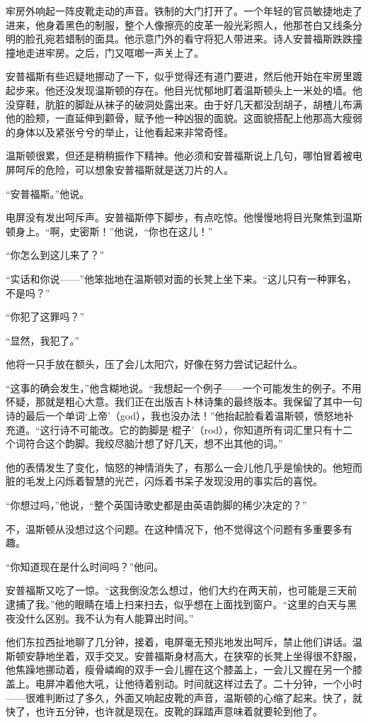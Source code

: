 牢房外响起一阵皮靴走动的声音。铁制的大门打开了。一个年轻的官员敏捷地走了进来，他身着黑色的制服，整个人像擦亮的皮革一般光彩照人，他那苍白又线条分明的脸孔宛若蜡制的面具。他示意门外的看守将犯人带进来。诗人安普福斯跌跌撞撞地走进牢房。之后，门又哐啷一声关上了。

安普福斯有些迟疑地挪动了一下，似乎觉得还有道门要进，然后他开始在牢房里踱起步来。他还没发现温斯顿的存在。他目光忧郁地盯着温斯顿头上一米处的墙。他没穿鞋，肮脏的脚趾从袜子的破洞处露出来。由于好几天都没刮胡子，胡楂儿布满他的脸颊，一直延伸到颧骨，赋予他一种凶狠的面貌。这面貌搭配上他那高大瘦弱的身体以及紧张兮兮的举止，让他看起来非常奇怪。

温斯顿很累，但还是稍稍振作下精神。他必须和安普福斯说上几句，哪怕冒着被电屏呵斥的危险，可以想象安普福斯就是送刀片的人。

``安普福斯。''他说。

电屏没有发出呵斥声。安普福斯停下脚步，有点吃惊。他慢慢地将目光聚焦到温斯顿身上。``啊，史密斯！''他说，``你也在这儿！''

``你怎么到这儿来了？''

``实话和你说——''他笨拙地在温斯顿对面的长凳上坐下来。``这儿只有一种罪名，不是吗？''

``你犯了这罪吗？''

``显然，我犯了。''

他将一只手放在额头，压了会儿太阳穴，好像在努力尝试记起什么。

``这事的确会发生，''他含糊地说。``我想起一个例子——一个可能发生的例子。不用怀疑，那就是粗心大意。我们正在出版吉卜林诗集的最终版本。我保留了其中一句诗的最后一个单词`上帝'（god），我也没办法！''他抬起脸看着温斯顿，愤怒地补充道。``这行诗不可能改。它的韵脚是`棍子'（rod），你知道所有词汇里只有十二个词符合这个韵脚。我绞尽脑汁想了好几天，想不出其他的词。''

他的表情发生了变化，恼怒的神情消失了，有那么一会儿他几乎是愉快的。他短而脏的毛发上闪烁着智慧的光芒，闪烁着书呆子发现没用的事实后的喜悦。

``你想过吗，''他说，``整个英国诗歌史都是由英语韵脚的稀少决定的？''

不，温斯顿从没想过这个问题。在这种情况下，他不觉得这个问题有多重要多有趣。

``你知道现在是什么时间吗？''他问。

安普福斯又吃了一惊。``这我倒没怎么想过，他们大约在两天前，也可能是三天前逮捕了我。''他的眼睛在墙上扫来扫去，似乎想在上面找到窗户。``这里的白天与黑夜没什么区别。我不认为有人能算出时间。''

他们东拉西扯地聊了几分钟，接着，电屏毫无预兆地发出呵斥，禁止他们讲话。温斯顿安静地坐着，双手交叉。安普福斯身材高大，在狭窄的长凳上坐得很不舒服，他焦躁地挪动着，瘦骨嶙峋的双手一会儿握在这个膝盖上，一会儿又握在另一个膝盖上。电屏冲着他大吼，让他待着别动。时间就这样过去了。二十分钟，一个小时——很难判断过了多久，外面又响起皮靴的声音，温斯顿的心缩了起来。快了，就快了，也许五分钟，也许就是现在。皮靴的踩踏声意味着就要轮到他了。


